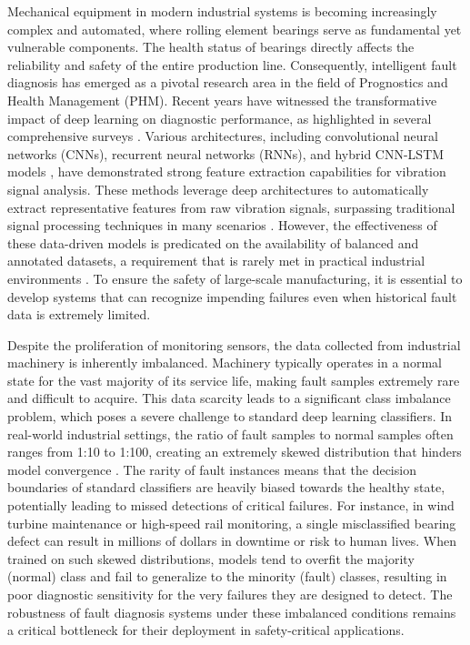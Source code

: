 \documentclass[conference,twocolumn]{IEEEtran}
\begin{document}
Mechanical equipment in modern industrial systems is becoming increasingly complex and automated, where rolling element bearings serve as fundamental yet vulnerable components. The health status of bearings directly affects the reliability and safety of the entire production line. Consequently, intelligent fault diagnosis has emerged as a pivotal research area in the field of Prognostics and Health Management (PHM). Recent years have witnessed the transformative impact of deep learning on diagnostic performance, as highlighted in several comprehensive surveys \cite{8, Lei2020, 9}. Various architectures, including convolutional neural networks (CNNs), recurrent neural networks (RNNs), and hybrid CNN-LSTM models \cite{10}, have demonstrated strong feature extraction capabilities for vibration signal analysis. These methods leverage deep architectures to automatically extract representative features from raw vibration signals, surpassing traditional signal processing techniques in many scenarios \cite{32}. However, the effectiveness of these data-driven models is predicated on the availability of balanced and annotated datasets, a requirement that is rarely met in practical industrial environments \cite{40, 41}. To ensure the safety of large-scale manufacturing, it is essential to develop systems that can recognize impending failures even when historical fault data is extremely limited.

Despite the proliferation of monitoring sensors, the data collected from industrial machinery is inherently imbalanced. Machinery typically operates in a normal state for the vast majority of its service life, making fault samples extremely rare and difficult to acquire. This data scarcity leads to a significant class imbalance problem, which poses a severe challenge to standard deep learning classifiers. In real-world industrial settings, the ratio of fault samples to normal samples often ranges from 1:10 to 1:100, creating an extremely skewed distribution that hinders model convergence \cite{32, 40}. The rarity of fault instances means that the decision boundaries of standard classifiers are heavily biased towards the healthy state, potentially leading to missed detections of critical failures. For instance, in wind turbine maintenance or high-speed rail monitoring, a single misclassified bearing defect can result in millions of dollars in downtime or risk to human lives. When trained on such skewed distributions, models tend to overfit the majority (normal) class and fail to generalize to the minority (fault) classes, resulting in poor diagnostic sensitivity for the very failures they are designed to detect. The robustness of fault diagnosis systems under these imbalanced conditions remains a critical bottleneck for their deployment in safety-critical applications.
\end{document}
